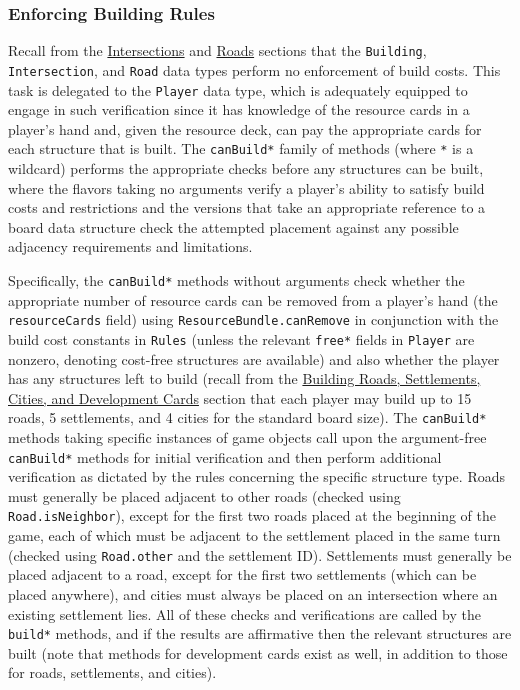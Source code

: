 \documentclass[pageno]{jpaper}
\begin{document}
\begin{doublespacing}
\hypertarget{sec:enforcing_building_rules}{}
\subsubsection{Enforcing Building Rules}

Recall from the \hyperlink{sec:intersections}{Intersections} and \hyperlink{sec:roads}{Roads} sections that the \lstinline$Building$, \lstinline$Intersection$, and \lstinline$Road$ data types perform no enforcement of build costs. This task is delegated to the \lstinline$Player$ data type, which is adequately equipped to engage in such verification since it has knowledge of the resource cards in a player's hand and, given the resource deck, can pay the appropriate cards for each structure that is built. The \lstinline$canBuild*$ family of methods (where \lstinline$*$ is a wildcard) performs the appropriate checks before any structures can be built, where the flavors taking no arguments verify a player's ability to satisfy build costs and restrictions and the versions that take an appropriate reference to a board data structure check the attempted placement against any possible adjacency requirements and limitations. 

Specifically, the \lstinline$canBuild*$ methods without arguments check whether the appropriate number of resource cards can be removed from a player's hand (the \lstinline$resourceCards$ field) using \lstinline$ResourceBundle.canRemove$ in conjunction with the build cost constants in \lstinline$Rules$ (unless the relevant \lstinline$free*$ fields in \lstinline$Player$ are nonzero, denoting cost-free structures are available) and also whether the player has any structures left to build (recall from the \hyperlink{sec:building_roads_settlements_cities_and_development_cards}{Building Roads, Settlements, Cities, and Development Cards} section that each player may build up to 15 roads, 5 settlements, and 4 cities for the standard board size). The \lstinline$canBuild*$ methods taking specific instances of game objects call upon the argument-free \lstinline$canBuild*$ methods for initial verification and then perform additional verification as dictated by the rules concerning the specific structure type. Roads must generally be placed adjacent to other roads (checked using \lstinline$Road.isNeighbor$), except for the first two roads placed at the beginning of the game, each of which must be adjacent to the settlement placed in the same turn (checked using \lstinline$Road.other$ and the settlement ID). Settlements must generally be placed adjacent to a road, except for the first two settlements (which can be placed anywhere), and cities must always be placed on an intersection where an existing settlement lies. All of these checks and verifications are called by the \lstinline$build*$ methods, and if the results are affirmative then the relevant structures are built (note that methods for development cards exist as well, in addition to those for roads, settlements, and cities).


\end{doublespacing}
\end{document}
